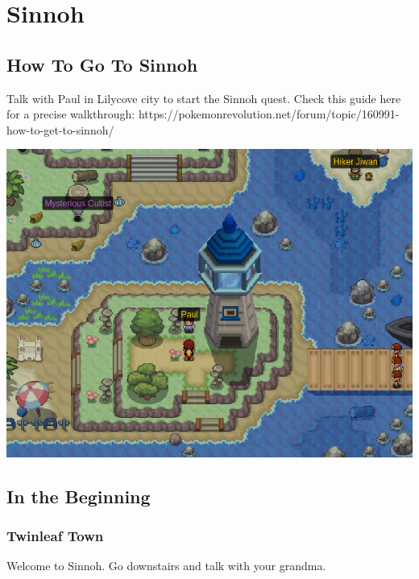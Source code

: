 \documentclass[11pt]{article}
\begin{document}
%
%
%
%
%

\section{Sinnoh}\label{sec:sinnoh}

\subsection{How To Go To Sinnoh}\label{subsec:how-to-go-to-sinnoh}
Talk with Paul in Lilycove city to start the Sinnoh quest.
Check this guide here for a precise walkthrough:
https://pokemonrevolution.net/forum/topic/160991-how-to-get-to-sinnoh/

\includegraphics[width=\textwidth]{walkthrough/Sinnoh/paul-lilycove}

\subsection{In the Beginning}\label{subsec:in-the-beginning}

\subsubsection{Twinleaf Town}\label{subsubsec:twinleaf-town}
Welcome to Sinnoh.
Go downstairs and talk with your grandma.
\end{document}
